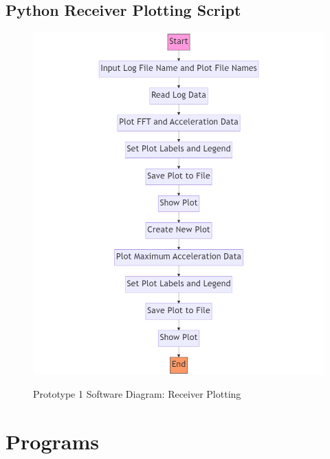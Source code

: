 \subsection{Python Receiver Plotting Script}
\begin{figure}[H]
	\centering
	\caption{Prototype 1 Software Diagram: Receiver Plotting}
	\includegraphics[width=\textwidth]{Sections/Design-Process/proto1-soft-diagram-receiver-plot.png}
	\label{proto1-soft-diagram-receiver-plot}
\end{figure}	

\clearpage
\section{Programs}
